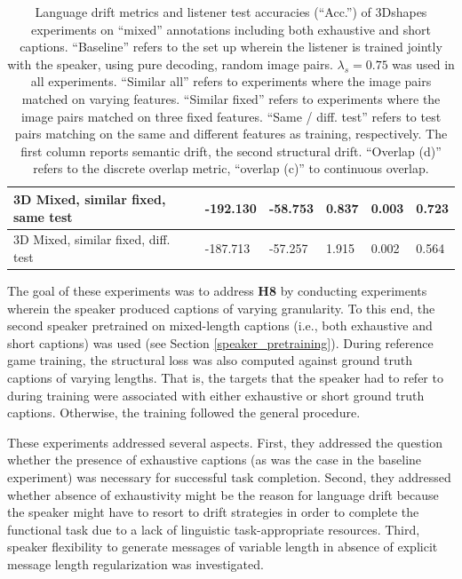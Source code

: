 \begin{table}[]
\begin{tabularx}{\textwidth}{|X|l|l|X|X|X|}
		3D Mixed, similar fixed, same test&      -192.130      &     -58.753      &   0.837      & 0.003   &     0.723                \\ \hline
		3D Mixed, similar fixed, diff. test &  -187.713       & -57.257     & 1.915        &  0.002   &    0.564       \\ \hline
	\end{tabularx}
	\caption{\label{tab:3dshapes_drift_metrics_basic_short}Language drift metrics and listener test accuracies (``Acc.'') of 3Dshapes experiments on ``mixed'' annotations including both exhaustive and short captions. ``Baseline'' refers to the set up wherein the listener is trained jointly with the speaker, using pure decoding, random image pairs. $\lambda_s = 0.75$ was used in all experiments. ``Similar all'' refers to experiments where the image pairs matched on varying features. ``Similar fixed'' refers to experiments where the image pairs matched on three fixed features. ``Same / diff. test'' refers to test pairs matching on the same and different features as training, respectively. The first column reports semantic drift, the second structural drift. ``Overlap (d)'' refers to the discrete overlap metric, ``overlap (c)'' to continuous overlap.}
\end{table}

The goal of these experiments was to address \textbf{H8} by conducting experiments wherein the speaker produced captions of varying granularity.
To this end, the second speaker pretrained on mixed-length captions (i.e., both exhaustive and short captions) was used (see Section \ref{speaker_pretraining}). During reference game training, the structural loss was also computed against ground truth captions of varying lengths. That is, the targets that the speaker had to refer to during training were associated with either exhaustive or short ground truth captions. Otherwise, the training followed the general procedure.

These experiments addressed several aspects. First, they addressed the question whether the presence of exhaustive captions (as was the case in the baseline experiment) was necessary for successful task completion. Second, they addressed whether absence of exhaustivity might be the reason for language drift because the speaker might have to resort to drift strategies in order to complete the functional task due to a lack of linguistic task-appropriate resources. 
Third, speaker flexibility to generate messages of variable length in absence of explicit message length regularization was investigated. 

